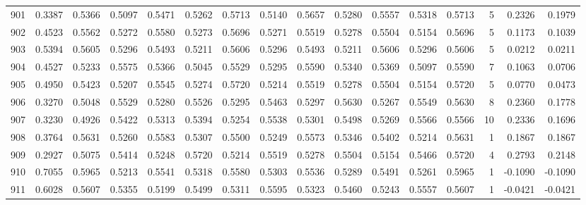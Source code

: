 \begin{tabular}{lrrrrrrrrrrrrrrr}
901 &      0.3387 &  0.5366 &  0.5097 &  0.5471 &  0.5262 &  0.5713 &  0.5140 &  0.5657 &  0.5280 &  0.5557 &   0.5318 &     0.5713 &      5 &                    0.2326 &                     0.1979 \\
902 &      0.4523 &  0.5562 &  0.5272 &  0.5580 &  0.5273 &  0.5696 &  0.5271 &  0.5519 &  0.5278 &  0.5504 &   0.5154 &     0.5696 &      5 &                    0.1173 &                     0.1039 \\
903 &      0.5394 &  0.5605 &  0.5296 &  0.5493 &  0.5211 &  0.5606 &  0.5296 &  0.5493 &  0.5211 &  0.5606 &   0.5296 &     0.5606 &      5 &                    0.0212 &                     0.0211 \\
904 &      0.4527 &  0.5233 &  0.5575 &  0.5366 &  0.5045 &  0.5529 &  0.5295 &  0.5590 &  0.5340 &  0.5369 &   0.5097 &     0.5590 &      7 &                    0.1063 &                     0.0706 \\
905 &      0.4950 &  0.5423 &  0.5207 &  0.5545 &  0.5274 &  0.5720 &  0.5214 &  0.5519 &  0.5278 &  0.5504 &   0.5154 &     0.5720 &      5 &                    0.0770 &                     0.0473 \\
906 &      0.3270 &  0.5048 &  0.5529 &  0.5280 &  0.5526 &  0.5295 &  0.5463 &  0.5297 &  0.5630 &  0.5267 &   0.5549 &     0.5630 &      8 &                    0.2360 &                     0.1778 \\
907 &      0.3230 &  0.4926 &  0.5422 &  0.5313 &  0.5394 &  0.5254 &  0.5538 &  0.5301 &  0.5498 &  0.5269 &   0.5566 &     0.5566 &     10 &                    0.2336 &                     0.1696 \\
908 &      0.3764 &  0.5631 &  0.5260 &  0.5583 &  0.5307 &  0.5500 &  0.5249 &  0.5573 &  0.5346 &  0.5402 &   0.5214 &     0.5631 &      1 &                    0.1867 &                     0.1867 \\
909 &      0.2927 &  0.5075 &  0.5414 &  0.5248 &  0.5720 &  0.5214 &  0.5519 &  0.5278 &  0.5504 &  0.5154 &   0.5466 &     0.5720 &      4 &                    0.2793 &                     0.2148 \\
910 &      0.7055 &  0.5965 &  0.5213 &  0.5541 &  0.5318 &  0.5580 &  0.5303 &  0.5536 &  0.5289 &  0.5491 &   0.5261 &     0.5965 &      1 &                   -0.1090 &                    -0.1090 \\
911 &      0.6028 &  0.5607 &  0.5355 &  0.5199 &  0.5499 &  0.5311 &  0.5595 &  0.5323 &  0.5460 &  0.5243 &   0.5557 &     0.5607 &      1 &                   -0.0421 &                    -0.0421 \\

\end{tabular}
